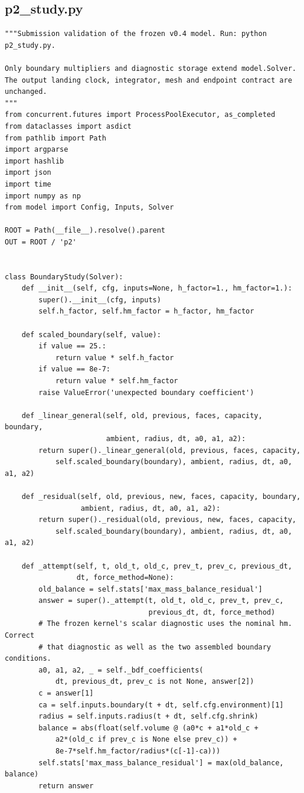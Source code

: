 \subsection{p2\_study.py}
\begin{verbatim}
"""Submission validation of the frozen v0.4 model. Run: python p2_study.py.

Only boundary multipliers and diagnostic storage extend model.Solver.
The output landing clock, integrator, mesh and endpoint contract are unchanged.
"""
from concurrent.futures import ProcessPoolExecutor, as_completed
from dataclasses import asdict
from pathlib import Path
import argparse
import hashlib
import json
import time
import numpy as np
from model import Config, Inputs, Solver

ROOT = Path(__file__).resolve().parent
OUT = ROOT / 'p2'


class BoundaryStudy(Solver):
    def __init__(self, cfg, inputs=None, h_factor=1., hm_factor=1.):
        super().__init__(cfg, inputs)
        self.h_factor, self.hm_factor = h_factor, hm_factor

    def scaled_boundary(self, value):
        if value == 25.:
            return value * self.h_factor
        if value == 8e-7:
            return value * self.hm_factor
        raise ValueError('unexpected boundary coefficient')

    def _linear_general(self, old, previous, faces, capacity, boundary,
                        ambient, radius, dt, a0, a1, a2):
        return super()._linear_general(old, previous, faces, capacity,
            self.scaled_boundary(boundary), ambient, radius, dt, a0, a1, a2)

    def _residual(self, old, previous, new, faces, capacity, boundary,
                  ambient, radius, dt, a0, a1, a2):
        return super()._residual(old, previous, new, faces, capacity,
            self.scaled_boundary(boundary), ambient, radius, dt, a0, a1, a2)

    def _attempt(self, t, old_t, old_c, prev_t, prev_c, previous_dt,
                 dt, force_method=None):
        old_balance = self.stats['max_mass_balance_residual']
        answer = super()._attempt(t, old_t, old_c, prev_t, prev_c,
                                  previous_dt, dt, force_method)
        # The frozen kernel's scalar diagnostic uses the nominal hm. Correct
        # that diagnostic as well as the two assembled boundary conditions.
        a0, a1, a2, _ = self._bdf_coefficients(
            dt, previous_dt, prev_c is not None, answer[2])
        c = answer[1]
        ca = self.inputs.boundary(t + dt, self.cfg.environment)[1]
        radius = self.inputs.radius(t + dt, self.cfg.shrink)
        balance = abs(float(self.volume @ (a0*c + a1*old_c +
            a2*(old_c if prev_c is None else prev_c)) +
            8e-7*self.hm_factor/radius*(c[-1]-ca)))
        self.stats['max_mass_balance_residual'] = max(old_balance, balance)
        return answer


\end{verbatim}
